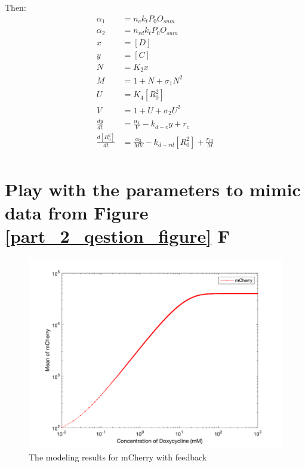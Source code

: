  
Then: 
\begin{equation} 
\begin{aligned} 
           \alpha_1 &= n_c k_t P_0 O_{sum} \\ 
           \alpha_2 &= n_{rd} k_t P_0 O_{sum} \\
	              x &= [D] \\
	              y &= [C] \\
	              N &= K_2x \\
	              M &= 1 + N + \sigma_1 N^2 \\
	              U &= K_4[R_0^2] \\
	              V &= 1 + U + \sigma_2 U^2 \\
      \frac{dy}{dt} &= \frac{\alpha_1}{V} - k_{d-c}y + r_c \\
\frac{d[R^2_0]}{dt} &= \frac{\alpha_2}{MV} - k_{d-rd}[R^2_0] + \frac{r_{rd}}{M} \\
\end{aligned} 
\end{equation}


\section{Play with the parameters to mimic data from Figure \ref{part_2_qestion_figure} F }

\begin{figure}[H]
\centering
\includegraphics[width=1.0\linewidth]{Figures/Q2_1.png}
\caption{The modeling results for mCherry with feedback}
\label{part_2_model}
\end{figure}

